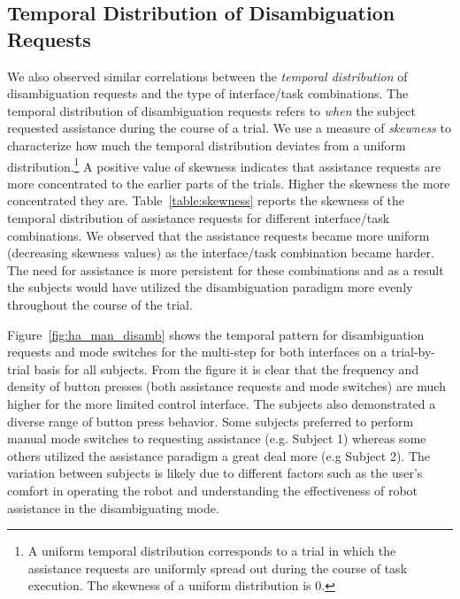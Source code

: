 \subsection{Temporal Distribution of Disambiguation Requests}
We also observed similar correlations between the \textit{temporal distribution} of disambiguation requests and the type of interface/task combinations. The temporal distribution of disambiguation requests refers to \textit{when} the subject requested assistance during the course of a trial. We use a measure of \textit{skewness} to characterize how much the temporal distribution deviates from a uniform distribution.\footnote{A uniform temporal distribution corresponds to a trial in which the assistance requests are uniformly spread out during the course of task execution. The skewness of a uniform distribution is $0$.} A positive value of skewness indicates that assistance requests are more concentrated to the earlier parts of the trials. Higher the skewness the more concentrated they are. Table~\ref{table:skewness} reports the skewness of the temporal distribution of assistance requests for different interface/task combinations. We observed that the assistance requests became more uniform (decreasing skewness values) as the interface/task combination became harder. The need for assistance is more persistent for these combinations and as a result the subjects would have utilized the disambiguation paradigm more evenly throughout the course of the trial. 


Figure~\ref{fig:ha_man_disamb} shows the temporal pattern for disambiguation requests and mode switches for the multi-step for both interfaces on a trial-by-trial basis for all subjects. From the figure it is clear that the frequency and density of button presses (both assistance requests and mode switches) are much higher for the more limited control interface. The subjects also demonstrated a diverse range of button press behavior. Some subjects preferred to perform manual mode switches to requesting assistance (e.g. Subject 1) whereas some others utilized the assistance paradigm a great deal more (e.g Subject 2). The variation between subjects is likely due to different factors such as the user's comfort in operating the robot and understanding the effectiveness of robot assistance in the disambiguating mode. 

